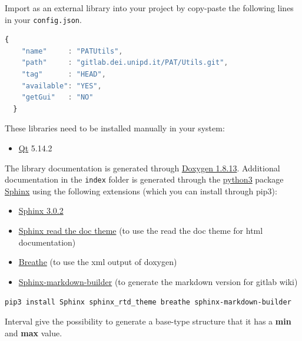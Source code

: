 

Import as an external library into your project by copy-paste the
following lines in your \texttt{config.json}.

\begin{lstlisting}[language=javascript, gobble=2]
  {
    "name"     : "PATUtils",
    "path"     : "gitlab.dei.unipd.it/PAT/Utils.git",
    "tag"      : "HEAD",
    "available": "YES",
    "getGui"   : "NO"
  }
\end{lstlisting}



These libraries need to be installed manually in your system:

\begin{itemize}
  \tightlist
  \item
        \href{https://www.qt.io/}{Qt} 5.14.2
\end{itemize}

The library documentation is generated through
\href{http://www.doxygen.nl/download.html}{Doxygen 1.8.13}. Additional
documentation in the \texttt{index} folder is generated through the
\href{https://www.anaconda.com/products/individual}{python3} package
\href{https://www.sphinx-doc.org/en/master/}{Sphinx} using the following
extensions (which you can install through pip3):

\begin{itemize}
  \tightlist
  \item
        \href{https://pypi.org/project/Sphinx/}{Sphinx 3.0.2}
  \item
        \href{https://sphinx-rtd-theme.readthedocs.io/en/stable/}{Sphinx read
          the doc theme} (to use the read the doc theme for html documentation)
  \item
        \href{https://pypi.org/project/breathe/}{Breathe} (to use the xml
        output of doxygen)
  \item
        \href{https://pypi.org/project/sphinx-markdown-builder/}{Sphinx-markdown-builder}
        (to generate the markdown version for gitlab wiki)
\end{itemize}

\texttt{pip3\ install\ Sphinx\ sphinx\_rtd\_theme\ breathe\ sphinx-markdown-builder}



Interval give the possibility to generate a base-type structure that it
has a \textbf{min} and \textbf{max} value.

